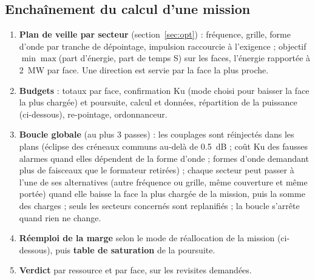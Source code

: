 \documentclass[11pt,a4paper]{article}
\begin{document}
\subsection{Enchaînement du calcul d'une mission}
\begin{enumerate}
  \item \textbf{Plan de veille par secteur} (section~\ref{sec:opt}) : fréquence, grille, forme d'onde par tranche de
        dépointage, impulsion raccourcie à l'exigence ; objectif $\min\max$(part d'énergie, part de temps S) sur les
        faces, l'énergie rapportée à \SI{2}{MW} par face. Une direction est servie par la face la plus proche.
  \item \textbf{Budgets} : totaux par face, confirmation Ku (mode choisi pour baisser la face la plus chargée) et
        poursuite, calcul et données, répartition de la puissance (ci-dessous), re-pointage, ordonnanceur.
  \item \textbf{Boucle globale} (au plus 3 passes) : les couplages sont réinjectés dans les plans (éclipse des créneaux
        communs au-delà de \SI{0.5}{dB} ; coût Ku des fausses alarmes quand elles dépendent de la forme d'onde ; formes
        d'onde demandant plus de faisceaux que le formateur retirées) ; chaque secteur peut passer à l'une de ses
        alternatives (autre fréquence ou grille, même couverture et même portée) quand elle baisse la face la plus
        chargée de la mission, puis la somme des charges ; seuls les secteurs concernés sont replanifiés ; la boucle
        s'arrête quand rien ne change.
  \item \textbf{Réemploi de la marge} selon le mode de réallocation de la mission (ci-dessous), puis \textbf{table de
        saturation} de la poursuite.
  \item \textbf{Verdict} par ressource et par face, sur les revisites demandées.
\end{enumerate}
\end{document}
